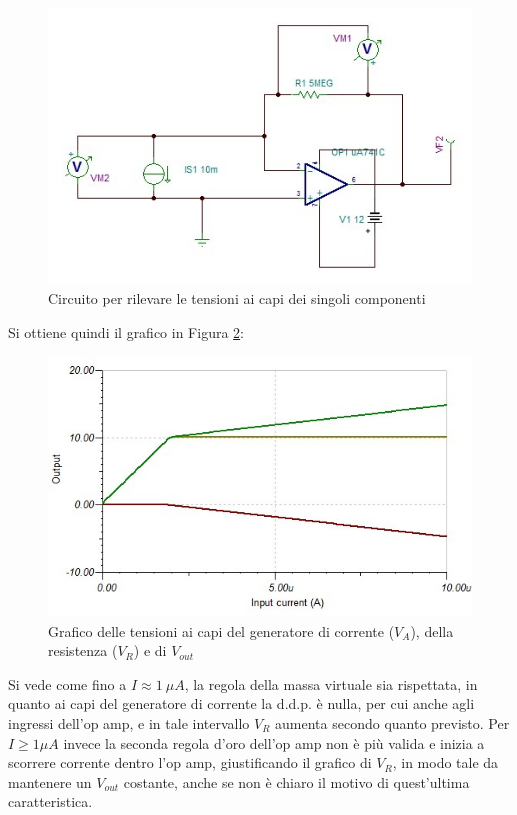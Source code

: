 \documentclass[journal, a4paper]{IEEEtran}
\begin{document}
\begin{figure}[htp]
\caption{Circuito per rilevare le tensioni ai capi dei singoli componenti}
\label{circuito_tina}
\centering
\includegraphics[scale=.4]{newTINA}
\end{figure}

Si ottiene quindi il grafico in Figura \ref{graf_tens}:\\

\begin{figure}[htp]
\centering
\includegraphics[scale=.5]{immagine3}
\caption{Grafico delle tensioni ai capi del generatore di corrente ($V_A$), della resistenza ($V_R$) e di $V_{out}$\\}
\label{graf_tens}
\end{figure}


Si vede come fino a $I\approx 1~\mu A$, la regola della massa virtuale sia rispettata, in quanto ai capi del generatore di corrente la d.d.p. è nulla, per cui anche agli ingressi dell'op amp, e in tale intervallo $V_R$ aumenta secondo quanto previsto. Per $I\geq 1 \mu A$ invece la seconda regola d'oro dell'op amp non è più valida e inizia a scorrere corrente dentro l'op amp, giustificando il grafico di $V_R$, in modo tale da mantenere un $V_{out}$ costante, anche se non è chiaro il motivo di quest'ultima caratteristica.\\
\end{document}
